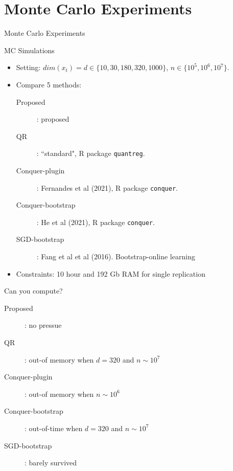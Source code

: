 \documentclass[beamer, t]{beamer}
\begin{document}
\section{Monte Carlo Experiments}

\begin{frame}
	\vfill
	\centering
	\LARGE{Monte Carlo Experiments}
	\vfill
\end{frame}


 
\begin{frame}{MC Simulations} 
	\begin{itemize}
		\item Setting:  $dim(x_t)=d\in\{10, 30, 180, 320, 1000\}$, $n\in\{10^5, 10^6,10^7\}.$
		\item Compare 5 methods:
		
		\begin{description}
			\item[Proposed]: proposed
			
			\item[QR]: ``standard", R package \texttt{quantreg}. 
			
			\item[Conquer-plugin]: Fernandes et al (2021), R package
			\texttt{conquer}.
			
			\item[Conquer-bootstrap]: He et al (2021), R package
			\texttt{conquer}.
			
			\item[SGD-bootstrap]: Fang et al et al (2016). Bootstrap-online learning
			
			
		\end{description}
		
		\medskip
		\item Constraints: 10 hour and 192 Gb RAM for single replication
	\end{itemize}
	
	
\end{frame}


\begin{frame}{Can you compute?} 
	
	\begin{description}
		
		\item[Proposed]: no pressue
		
		\item[QR]:  out-of memory when $d=320$ and $n\sim 10^7$
		
		\item[Conquer-plugin]:  out-of memory when $n\sim 10^6$
		
		\item[Conquer-bootstrap]:
		out-of-time when   $d=320$ and $n\sim 10^7$ 
		
		\item[SGD-bootstrap]: barely survived 
		
		
	\end{description}
	
	
	
\end{frame}
\end{document}

